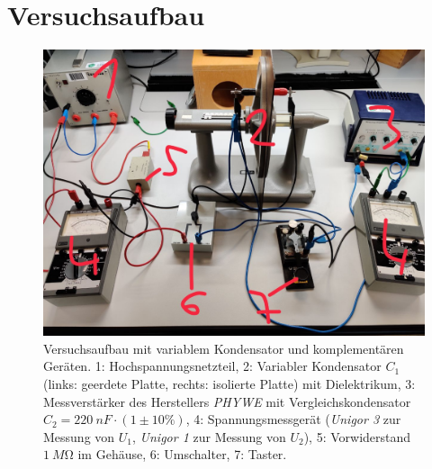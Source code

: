 \chapter{Versuchsaufbau}
%
\begin{figure}[h]
    \centering
    \includegraphics[width=\textwidth]{versuchsaufbau.jpg}
    \caption[Versuchsaufbau]{Versuchsaufbau mit variablem Kondensator und komplementären Geräten.
    1: Hochspannungsnetzteil,
    2: Variabler Kondensator $ C_{1} $ (links: geerdete Platte, rechts: isolierte Platte) mit Dielektrikum,
    3: Messverstärker des Herstellers \textit{PHYWE} mit Vergleichskondensator $ C_{2}=\SI{220}{nF}\cdot(1\pm10\%) $,
    4: Spannungsmessgerät (\textit{Unigor 3} zur Messung von $ U_{1} $, \textit{Unigor 1} zur Messung von $ U_{2} $),
    5: Vorwiderstand $ \SI{1}{M\ohm} $ im Gehäuse,
    6: Umschalter,
    7: Taster.
    }
    \label{fig:aufbau}
\end{figure}
%
